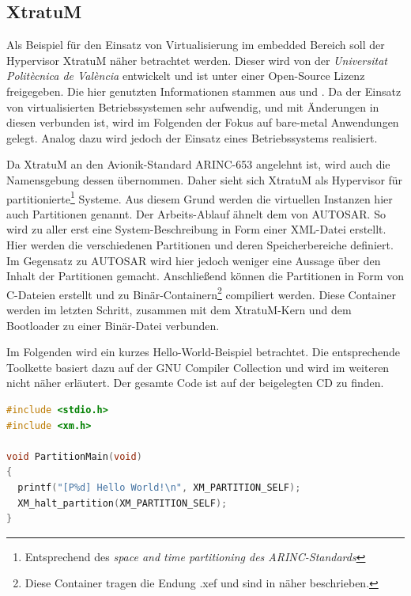 \documentclass[
  a4paper,					    %
  twoside,
  DIV=calc,     				%
  bibliography=totoc,
  cleardoublepage=empty,
  ngerman,     					%
  final       					%
]{scrbook}
\begin{document}
\subsection{XtratuM}
\label{sec:xtratum}
Als Beispiel für den Einsatz von Virtualisierung im embedded Bereich soll der Hypervisor XtratuM näher betrachtet werden. Dieser wird von der \emph{Universitat Politècnica de València} entwickelt und ist unter einer Open-Source Lizenz freigegeben. Die hier genutzten Informationen stammen aus \cite{xm:usermanual} und \cite{xm:reference}. Da der Einsatz von virtualisierten Betriebssystemen sehr aufwendig, und mit Änderungen in diesen verbunden ist, wird im Folgenden der Fokus auf bare-metal Anwendungen gelegt. Analog dazu wird jedoch der Einsatz eines Betriebssystems realisiert.

Da XtratuM an den Avionik-Standard ARINC-653 angelehnt ist, wird auch die Namensgebung dessen übernommen. Daher sieht sich XtratuM als Hypervisor für partitionierte\footnote{Entsprechend des \emph{space and time partitioning des ARINC-Standards}} Systeme. Aus diesem Grund werden die virtuellen Instanzen hier auch Partitionen genannt. Der Arbeits-Ablauf ähnelt dem von AUTOSAR. So wird zu aller erst eine System-Beschreibung in Form einer XML-Datei erstellt. Hier werden die verschiedenen Partitionen und deren Speicherbereiche definiert. Im Gegensatz zu AUTOSAR wird hier jedoch weniger eine Aussage über den Inhalt der Partitionen gemacht. Anschließend können die Partitionen in Form von C-Dateien erstellt und zu Binär-Containern\footnote{Diese Container tragen die Endung .xef und sind in \cite[Seite 68]{xm:usermanual} näher beschrieben.} compiliert werden. Diese Container werden im letzten Schritt, zusammen mit dem XtratuM-Kern und dem Bootloader zu einer Binär-Datei verbunden.

Im Folgenden wird ein kurzes Hello-World-Beispiel betrachtet. Die entsprechende Toolkette basiert dazu auf der GNU Compiler Collection und wird im weiteren nicht näher erläutert. Der gesamte Code ist auf der beigelegten CD zu finden. 

\begin{lstlisting}[frame=single, language=C, basicstyle=\footnotesize, caption={XtratuM Beispiel Partition}, label={lst:xtratum_partition}]
#include <stdio.h>
#include <xm.h>

void PartitionMain(void)
{
  printf("[P%d] Hello World!\n", XM_PARTITION_SELF);
  XM_halt_partition(XM_PARTITION_SELF);
}
\end{lstlisting}
\end{document}
